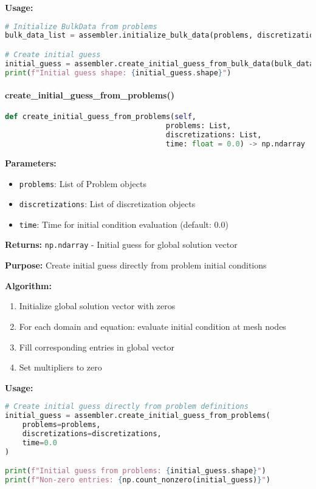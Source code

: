 \textbf{Usage:}
\begin{lstlisting}[language=Python, caption=BulkData Initial Guess Usage]
# Initialize BulkData from problems
bulk_data_list = assembler.initialize_bulk_data(problems, discretizations, time=0.0)

# Create initial guess
initial_guess = assembler.create_initial_guess_from_bulk_data(bulk_data_list)
print(f"Initial guess shape: {initial_guess.shape}")
\end{lstlisting}

\paragraph{create\_initial\_guess\_from\_problems()}\leavevmode
\begin{lstlisting}[language=Python, caption=Initial Guess from Problems Method]
def create_initial_guess_from_problems(self, 
                                     problems: List,
                                     discretizations: List,
                                     time: float = 0.0) -> np.ndarray
\end{lstlisting}

\textbf{Parameters:}
\begin{itemize}
    \item \texttt{problems}: List of Problem objects
    \item \texttt{discretizations}: List of discretization objects
    \item \texttt{time}: Time for initial condition evaluation (default: 0.0)
\end{itemize}

\textbf{Returns:} \texttt{np.ndarray} - Initial guess for global solution vector

\textbf{Purpose:} Create initial guess directly from problem initial conditions

\textbf{Algorithm:}
\begin{enumerate}
    \item Initialize global solution vector with zeros
    \item For each domain and equation: evaluate initial condition at mesh nodes
    \item Fill corresponding entries in global vector
    \item Set multipliers to zero
\end{enumerate}

\textbf{Usage:}
\begin{lstlisting}[language=Python, caption=Problem Initial Guess Usage]
# Create initial guess directly from problem definitions
initial_guess = assembler.create_initial_guess_from_problems(
    problems=problems,
    discretizations=discretizations,
    time=0.0
)

print(f"Initial guess from problems: {initial_guess.shape}")
print(f"Non-zero entries: {np.count_nonzero(initial_guess)}")
\end{lstlisting}

